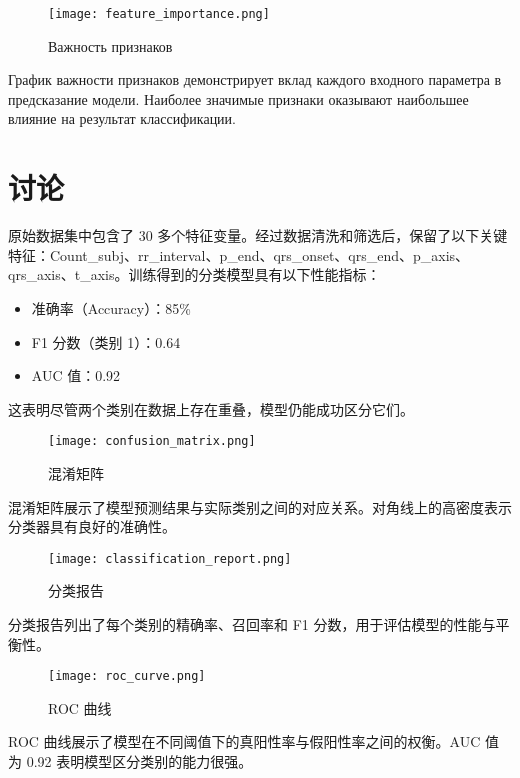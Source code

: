 \documentclass{article}
\providecommand{\pcsync}{\par\vspace{\baselineskip}}
\begin{document}
\begin{paracol}{2}
\begin{figure}[H]
\centering
\texttt{[image: feature\_importance.png]}
\caption{Важность признаков}
\end{figure}

График важности признаков демонстрирует вклад каждого входного параметра в предсказание модели. Наиболее значимые признаки оказывают наибольшее влияние на результат классификации.

\switchcolumn

\section{讨论}
\pcsync
原始数据集中包含了 30 多个特征变量。经过数据清洗和筛选后，保留了以下关键特征：Count\_subj、rr\_interval、p\_end、qrs\_onset、qrs\_end、p\_axis、qrs\_axis、t\_axis。训练得到的分类模型具有以下性能指标：

\begin{itemize}
\item 准确率（Accuracy）：85\%
\item F1 分数（类别 1）：0.64
\item AUC 值：0.92
\end{itemize}

这表明尽管两个类别在数据上存在重叠，模型仍能成功区分它们。

\begin{figure}[H]
    \centering
    \texttt{[image: confusion\_matrix.png]}
    \caption{混淆矩阵}
    \label{fig:enter-label}
\end{figure}

混淆矩阵展示了模型预测结果与实际类别之间的对应关系。对角线上的高密度表示分类器具有良好的准确性。



\begin{figure}[H]
\centering
\texttt{[image: classification\_report.png]}
\caption{分类报告}
\end{figure}

分类报告列出了每个类别的精确率、召回率和 F1 分数，用于评估模型的性能与平衡性。

\begin{figure}[H]
\centering
\texttt{[image: roc\_curve.png]}
\caption{ROC 曲线}
\end{figure}

ROC 曲线展示了模型在不同阈值下的真阳性率与假阳性率之间的权衡。AUC 值为 0.92 表明模型区分类别的能力很强。



\end{paracol}
\end{document}
